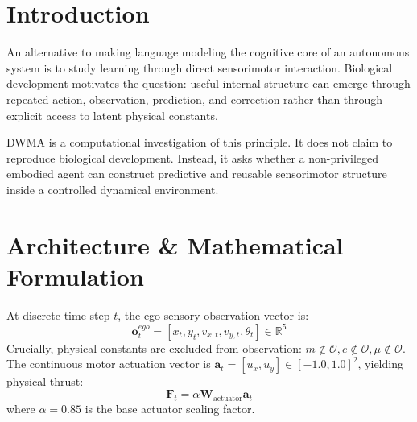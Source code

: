 \documentclass[11pt,a4paper]{article}
\begin{document}
\begin{abstract}
\begin{enumerate}
    \item \textbf{Nonlinear Hypothesis Discrimination:} Primary survival analysis demonstrates that epistemic action selection discriminates between linear viscous drag ($H_1$) and quadratic drag ($H_2$) substantially faster and more reliably than undirected exploration (Kaplan-Meier median latency of $7.0$ steps with $0\%$ censoring vs $23.0$ steps with $28.0\%$ right-censored at the 30-step observation horizon; Mantel-Cox log-rank $\chi^2 = 92.28, p < 10^{-20}$; $50/50$ uncensored DWMA runs vs $36/50$ uncensored random runs).
\end{enumerate}
All empirical claims are strictly bounded to the simulated dynamical environment. No claims of AGI, consciousness, metaphysical causality, or human-like understanding are made.
\end{abstract}

\section{Introduction}
An alternative to making language modeling the cognitive core of an autonomous system is to study learning through direct sensorimotor interaction. Biological development motivates the question: useful internal structure can emerge through repeated action, observation, prediction, and correction rather than through explicit access to latent physical constants.

DWMA is a computational investigation of this principle. It does not claim to reproduce biological development. Instead, it asks whether a non-privileged embodied agent can construct predictive and reusable sensorimotor structure inside a controlled dynamical environment.

\section{Architecture \& Mathematical Formulation}
At discrete time step $t$, the ego sensory observation vector is:
\begin{equation}
\mathbf{o}_t^{ego} = [x_t, y_t, v_{x,t}, v_{y,t}, \theta_t] \in \mathbb{R}^5
\end{equation}
Crucially, physical constants are excluded from observation: $m \notin \mathcal{O}, e \notin \mathcal{O}, \mu \notin \mathcal{O}$.
The continuous motor actuation vector is $\mathbf{a}_t = [u_x, u_y] \in [-1.0, 1.0]^2$, yielding physical thrust:
\begin{equation}
\mathbf{F}_t = \alpha \mathbf{W}_{\text{actuator}} \mathbf{a}_t
\end{equation}
where $\alpha = 0.85$ is the base actuator scaling factor.
\end{document}
